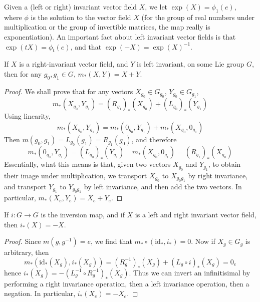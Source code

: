 Given a (left or right) invariant vector field $X$, we let $\exp(X) = \phi_1(e)$, where $\phi$ is the solution to the vector field $X$ (for the group of real numbers under multiplication or the group of invertible matrices, the map really is exponentiation). An important fact about left invariant vector fields is that $\exp(tX) = \phi_t(e)$, and that $\exp(-X) = \exp(X)^{-1}$. 

\begin{theorem}
    If $X$ is a right-invariant vector field, and $Y$ is left invariant, on some Lie group $G$, then for any $g_0, g_1 \in G$, $m_*(X,Y) = X + Y$.
\end{theorem}
\begin{proof}
    We shall prove that for any vectors $X_{g_0} \in G_{g_0}$, $Y_{g_0} \in G_{g_1}$,
    \[ m_*(X_{g_0}, Y_{g_1}) = (R_{g_1})_*(X_{g_0}) + (L_{g_0})_*(Y_{g_1}) \]
    Using linearity,
    \[ m_*(X_{g_0}, Y_{g_1}) = m_*(0_{g_0}, Y_{g_1}) + m_*(X_{g_0}, 0_{g_1}) \]
    Then $m(g_0, g_1) = L_{g_0}(g_1) = R_{g_1}(g_0)$, and therefore
    \[ m_*(0_{g_0}, Y_{g_1}) = (L_{g_0})_*(Y_{g_1})\ \ \ \ \ m_*(X_{g_0}, 0_{g_1}) = (R_{g_1})_*(X_{g_0}) \]
    Essentially, what this means is that, given two vectors $X_{g_0}$ and $Y_{g_1}$, to obtain their image under multiplication, we transport $X_{g_0}$ to $X_{g_0g_1}$ by right invariance, and transport $Y_{g_1}$ to $Y_{g_0g_1}$ by left invariance, and then add the two vectors. In particular, $m_*(X_e, Y_e) = X_e + Y_e$.
\end{proof}

\begin{theorem}
    If $i: G \to G$ is the inversion map, and if $X$ is a left and right invariant vector field, then $i_*(X) = -X$.
\end{theorem}
\begin{proof}
    Since $m(g,g^{-1}) = e$, we find that $m_* \circ (\text{id}_*, i_*) = 0$. Now if $X_g \in G_g$ is arbitrary, then
    \[ m_*(\text{id}_*(X_g), i_*(X_g)) = (R_g^{-1})_*(X_g) + (L_g \circ i)_*(X_g) = 0_e \]
    hence $i_*(X_g) = - (L_g^{-1} \circ R_g^{-1})_*(X_g)$. Thus we can invert an infinitisimal by performing a right invariance operation, then a left invariance operation, then a negation. In particular, $i_*(X_e) = - X_e$.
\end{proof}